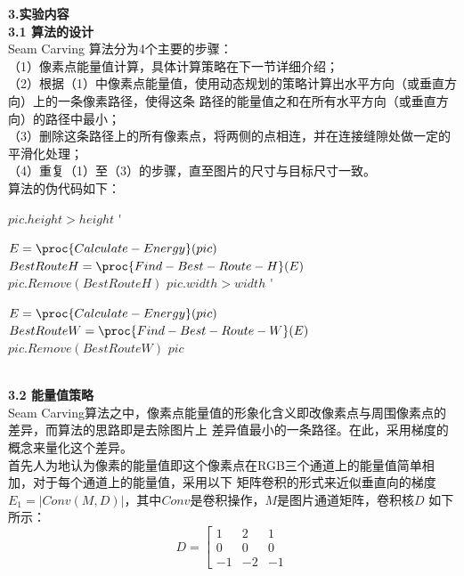 \documentclass[a4paper]{article}
\begin{document}
\begin{enumerate}
  \textbf{3.实验内容}\\
  \textbf{3.1 算法的设计}\\
  \medskip
  Seam Carving 算法分为4个主要的步骤：\\
  （1）像素点能量值计算，具体计算策略在下一节详细介绍；\\
  （2）根据（1）中像素点能量值，使用动态规划的策略计算出水平方向（或垂直方向）上的一条像素路径，使得这条
  路径的能量值之和在所有水平方向（或垂直方向）的路径中最小；\\
  （3）删除这条路径上的所有像素点，将两侧的点相连，并在连接缝隙处做一定的平滑化处理；\\
  （4）重复（1）至（3）的步骤，直至图片的尺寸与目标尺寸一致。\\
  算法的伪代码如下：\\
    \newcommand{\Doo}{\>\textbf{}\hspace*{-0.7em}\'\addtocounter{indent}{1}}
    \begin{minipage}{320pt}
    \begin{codebox}
        \li \While $pic.height > height$
            \Doo 
        \li     $E = \proc{Calculate-Energy}(pic)$
        \li     $BestRouteH = \proc{Find-Best-Route-H}(E)$
        \li     $pic.Remove(BestRouteH)$
            \End
        \li \While $pic.width > width$
            \Doo 
        \li     $E = \proc{Calculate-Energy}(pic)$
        \li     $BestRouteW = \proc{Find-Best-Route-W}(E)$
        \li     $pic.Remove(BestRouteW)$
            \End
        \li \Return $pic$
    \end{codebox}
\end{minipage}\\
  \medskip
  \textbf{3.2 能量值策略}\\
  \medskip
  Seam Carving算法之中，像素点能量值的形象化含义即改像素点与周围像素点的差异，而算法的思路即是去除图片上
  差异值最小的一条路径。在此，采用梯度的概念来量化这个差异。\\
  首先人为地认为像素的能量值即这个像素点在RGB三个通道上的能量值简单相加，对于每个通道上的能量值，采用以下
  矩阵卷积的形式来近似垂直向的梯度$E_1 = |Conv(M,D)|$，其中$Conv$是卷积操作，$M$是图片通道矩阵，卷积核$D$
  如下所示：
  $$ D =
  \left[
  \begin{matrix}
    1 & 2 & 1 \\
    0 & 0 & 0 \\
    -1 & -2 & -1
  \end{matrix}
$$
\end{enumerate}
\end{document}
